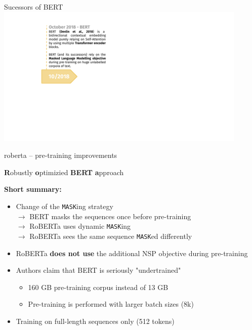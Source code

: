 \begin{frame}[noframenumbering]{Sucessors of BERT}
\hbox{\hspace{-0.5em} \includegraphics[width=12cm,page=4]{figure/transfer_learning_timeline3_nlp.pdf}}
\end{frame}


\begin{frame}{roberta -- pre-training improvements}

\vfill

\textbf{R}obustly \textbf{o}ptimizied \textbf{BERT} \textbf{a}pproach \\ \medskip\medskip

\textbf{Short summary:}

	\begin{itemize}
		\item Change of the \texttt{MASK}ing strategy  \\
					$\to$ BERT masks the sequences once before pre-training  \\
					$\to$ RoBERTa uses dynamic \texttt{MASK}ing  \\
					$\to$ RoBERTa sees the same sequence \texttt{MASK}ed differently
		\item RoBERTa \textbf{does not use} the additional NSP objective during pre-training
		\item Authors claim that BERT is seriously "undertrained"
			\begin{itemize}
				\item 160 GB pre-training corpus instead of 13 GB
				\item Pre-training is performed with larger batch sizes (8k)
			\end{itemize}
		\item Training on full-length sequences only (512 tokens)
	\end{itemize}
	
\vfill

\end{frame}

